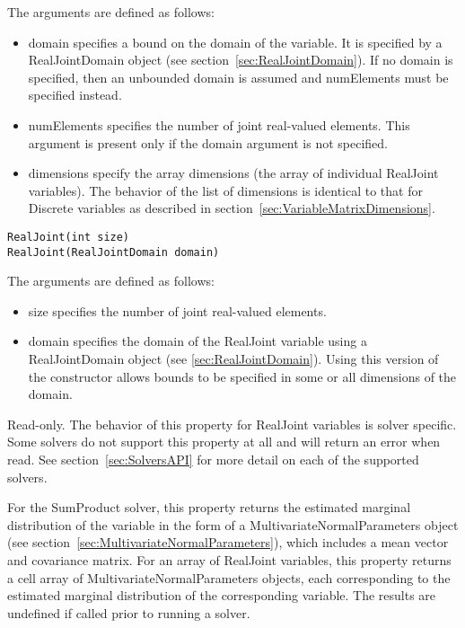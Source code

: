 The arguments are defined as follows:

\begin{itemize}
\item domain specifies a bound on the domain of the variable.  It is specified by a RealJointDomain object (see section~\ref{sec:RealJointDomain}).  If no domain is specified, then an unbounded domain is assumed and numElements must be specified instead.
\item numElements specifies the number of joint real-valued elements. This argument is present only if the domain argument is not specified.
\item dimensions specify the array dimensions (the array of individual RealJoint variables).  The behavior of the list of dimensions is identical to that for Discrete variables as described in section~\ref{sec:VariableMatrixDimensions}.
\end{itemize}
\fi

\ifjava
\begin{lstlisting}
RealJoint(int size)
RealJoint(RealJointDomain domain)
\end{lstlisting}

The arguments are defined as follows:

\begin{itemize}
\item size specifies the number of joint real-valued elements.
\item domain specifies the domain of the RealJoint variable using a RealJointDomain object (see \ref{sec:RealJointDomain}).  Using this version of the constructor allows bounds to be specified in some or all dimensions of the domain.
\end{itemize}
\fi


\label{sec:RealJoint.Belief}

Read-only.  The behavior of this property for RealJoint variables is solver specific.  Some solvers do not support this property at all and will return an error when read.  See section~\ref{sec:SolversAPI} for more detail on each of the supported solvers.

For the SumProduct solver, this property returns the estimated marginal distribution of the variable in the form of a MultivariateNormalParameters object (see section~\ref{sec:MultivariateNormalParameters}), which includes a mean vector and covariance matrix.  \ifmatlab For an array of RealJoint variables, this property returns a cell array of MultivariateNormalParameters objects, each corresponding to the estimated marginal distribution of the corresponding variable. \fi The results are undefined if called prior to running a solver.

